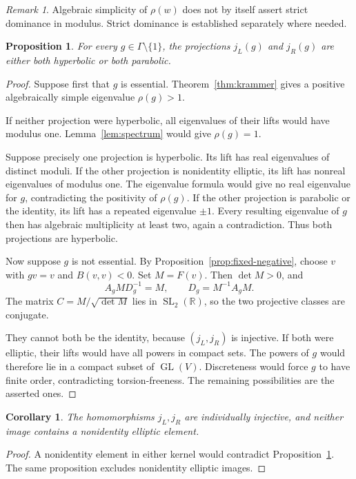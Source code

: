 \documentclass[11pt,reqno]{amsart}
\newcommand{\R}{\mathbb{R}}
\theoremstyle{plain}
\newtheorem{proposition}[theorem]{Proposition}
\newtheorem{corollary}[theorem]{Corollary}
\theoremstyle{definition}
\theoremstyle{remark}
\newtheorem{remark}[theorem]{Remark}
\numberwithin{equation}{section}
\begin{document}
\begin{remark}
Algebraic simplicity of $\rho(w)$ does not by itself assert strict dominance in modulus. Strict dominance is established separately where needed.
\end{remark}
\begin{proposition}\label{prop:types}
For every $g\in\Gamma\setminus\{1\}$, the projections $j_L(g)$ and $j_R(g)$ are either both hyperbolic or both parabolic.
\end{proposition}
\begin{proof}
Suppose first that $g$ is essential. Theorem~\ref{thm:krammer} gives a positive algebraically simple eigenvalue $\rho(g)>1$.

If neither projection were hyperbolic, all eigenvalues of their lifts would have modulus one. Lemma~\ref{lem:spectrum} would give $\rho(g)=1$.

Suppose precisely one projection is hyperbolic. Its lift has real eigenvalues of distinct moduli. If the other projection is nonidentity elliptic, its lift has nonreal eigenvalues of modulus one. The eigenvalue formula would give no real eigenvalue for $g$, contradicting the positivity of $\rho(g)$. If the other projection is parabolic or the identity, its lift has a repeated eigenvalue $\pm1$. Every resulting eigenvalue of $g$ then has algebraic multiplicity at least two, again a contradiction. Thus both projections are hyperbolic.

Now suppose $g$ is not essential. By Proposition~\ref{prop:fixed-negative}, choose $v$ with $gv=v$ and $B(v,v)<0$. Set $M=F(v)$. Then $\det M>0$, and
\[
A_gMD_g^{-1}=M,\qquad D_g=M^{-1}A_gM.
\]
The matrix $C=M/\sqrt{\det M}$ lies in $\operatorname{SL}_2(\R)$, so the two projective classes are conjugate.

They cannot both be the identity, because $(j_L,j_R)$ is injective. If both were elliptic, their lifts would have all powers in compact sets. The powers of $g$ would therefore lie in a compact subset of $\operatorname{GL}(V)$. Discreteness would force $g$ to have finite order, contradicting torsion-freeness. The remaining possibilities are the asserted ones.
\end{proof}

\begin{corollary}\label{cor:faithful}
The homomorphisms $j_L,j_R$ are individually injective, and neither image contains a nonidentity elliptic element.
\end{corollary}
\begin{proof}
A nonidentity element in either kernel would contradict Proposition~\ref{prop:types}. The same proposition excludes nonidentity elliptic images.
\end{proof}
\end{document}
